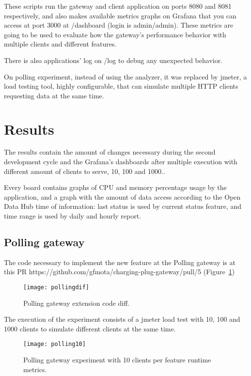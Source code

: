 These scripts run the gateway and client application on ports 8080 and 8081 respectively, and also makes available metrics graphs on Grafana that you can access at port 3000 at /dashboard (login is admin/admin). These metrics are going to be used to evaluate how the gateway's performance behavior with multiple clients and different features.

There is also applications' log on /log to debug any unexpected behavior.

On polling experiment, instead of using the analyzer, it was replaced by jmeter, a load testing tool, highly configurable, that can simulate multiple HTTP clients requesting data at the same time.

\section{Results}
\label{sec:results}

The results contain the amount of changes necessary during the second development cycle and the Grafana's dashboards after multiple execution with different amount of clients to serve, 10, 100 and 1000..

Every board contains graphs of CPU and memory percentage usage by the application, and a graph with the amount of data access according to the Open Data Hub time of information: last status is used by current status feature, and time range is used by daily and hourly report.

\subsection*{Polling gateway}
\label{sec:pollingresult}

The code necessary to implement the new feature at the Polling gateway is at this PR https://github.com/gfmota/charging-plug-gateway/pull/5 (Figure~\ref{fig:pollingdif})

\begin{figure}
    \centering
    \texttt{[image: pollingdif]}
    \caption{Polling gateway extension code diff.\label{fig:pollingdif}}
\end{figure}

The execution of the experiment consists of a jmeter load test with 10, 100 and 1000 clients to simulate different clients at the same time.

\begin{figure}
    \centering
    \texttt{[image: polling10]}
    \caption{Polling gateway experiment with 10 clients per feature runtime metrics.\label{fig:polling10}}
\end{figure}

